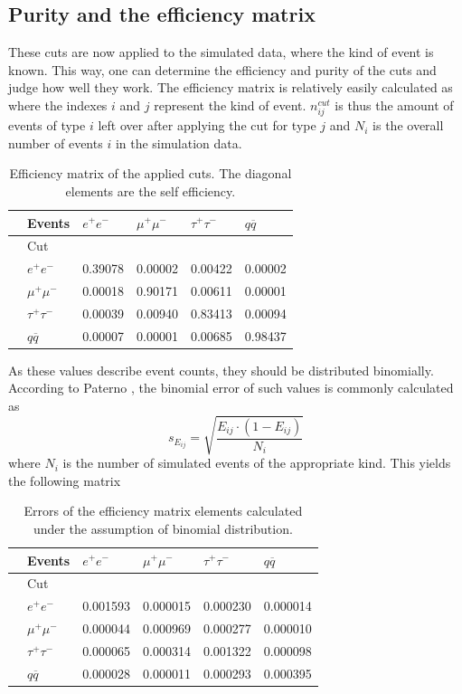 \subsection{Purity and the efficiency matrix}
These cuts are now applied to the simulated data, where the kind of event is known. This way, one can determine the efficiency and purity of the cuts and judge how well they work. 
The efficiency matrix is relatively easily calculated as
\begin{equation}
\end{equation}
where the indexes $i$ and $j$ represent the kind of event. $n_{ij}^{cut}$ is thus the amount of events of type $i$ left over after applying the cut for type $j$ and $N_i$ is the overall number of events $i$ in the simulation data.
\begin{table}[H]\centering
	\begin{tabular}{@{}llllll@{}}
		\toprule
		&Events &$e^+e^-$&$\mu^+\mu^-$&$\tau^+\tau^-$&$q\overline{q}$\\
		\midrule
		&Cut&&&&\\
		&$e^+e^-$&0.39078&0.00002&0.00422&0.00002\\
		&$\mu^+\mu^-$&0.00018&0.90171&0.00611&0.00001\\
		&$\tau^+\tau^-$&0.00039&0.00940&0.83413&0.00094\\
		&$q\overline{q}$&0.00007&0.00001&0.00685&0.98437\\
	\end{tabular}
	\caption[Efficiency matrix]{Efficiency matrix of the applied cuts. The diagonal elements are the self efficiency.}
	\label{tb:efficiency}
\end{table}

As these values describe event counts, they should be distributed binomially. According to Paterno \cite{binpaper}, the binomial error of such values is commonly calculated as
\begin{equation}
s_{E_{ij}}=\sqrt{\frac{E_{ij}\cdot(1-E_{ij})}{N_i}}
\end{equation}
where $N_i$ is the number of simulated events of the appropriate kind. This yields the following matrix

\begin{table}[H]\centering
	\begin{tabular}{@{}llllll@{}}
		\toprule
		&Events &$e^+e^-$&$\mu^+\mu^-$&$\tau^+\tau^-$&$q\overline{q}$\\
		\midrule
		&Cut&&&&\\
		&$e^+e^-$&0.001593&0.000015&0.000230&0.000014\\
		&$\mu^+\mu^-$&0.000044&0.000969&0.000277&0.000010\\
		&$\tau^+\tau^-$&0.000065&0.000314&0.001322&0.000098\\
		&$q\overline{q}$&0.000028&0.000011&0.000293&0.000395\\
		\bottomrule
	\end{tabular}
	\caption[Efficiency error matrix]{Errors of the efficiency matrix elements calculated under the assumption of binomial distribution.}
	\label{tb:efficiencyerr}
\end{table}

